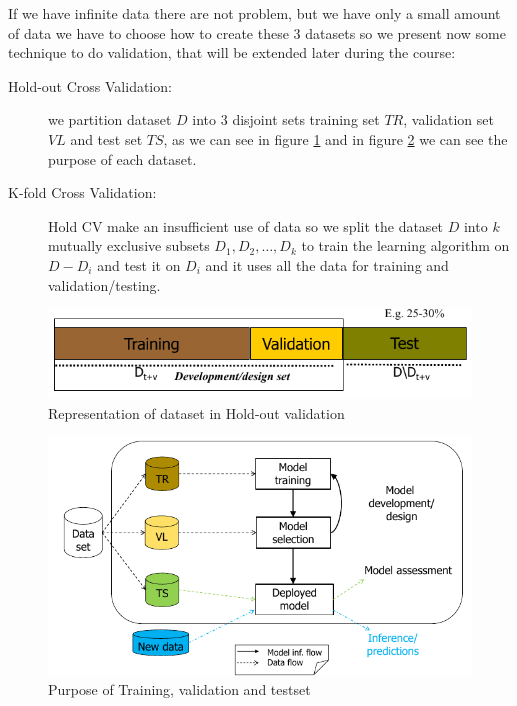 \begin{description}
                         If we have infinite data there are not problem, but we have only a small amount of data
                         we have to choose how to create these $3$ datasets so we present now some technique
                         to do validation, that will be extended later during the course:
                         \begin{description}
                             \item [Hold-out Cross Validation: ] we partition dataset $D$ into $3$ disjoint sets
                                    training set $TR$, validation set $VL$ and test set $TS$, as we can see
                                    in figure \ref{img:hold-out} and in figure \ref{img:dataset} we can see
                                    the purpose of each dataset.
                             
                            \item [K-fold Cross Validation: ] Hold CV make an insufficient use of data so we 
                                  split the dataset $D$ into $k$ mutually exclusive subsets $D_1, D_2, \dots, D_k$
                                  to train the learning algorithm on $D - D_i$ and test it on $D_i$ and it uses
                                  all the data for training and validation/testing.
                        \end{description}

                        \begin{figure}
                            \caption{Representation of dataset in Hold-out validation}
                            \label{img:hold-out}
                            \includegraphics[width=\textwidth]{images/holdOut}
                        \end{figure}

                        \begin{figure}
                            \caption{Purpose of Training, validation and testset}
                            \label{img:dataset}
                            \includegraphics[width=\textwidth]{images/dataSet}
                        \end{figure}


\end{description}

